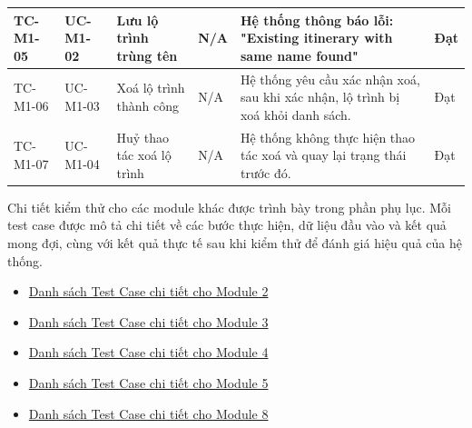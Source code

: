 \begin{landscape}
\begin{longtable}{|p{2.2cm}|p{2.2cm}|p{4cm}|p{4.5cm}|p{6cm}|p{2cm}|}
TC-M1-05 & UC-M1-02 & Lưu lộ trình trùng tên& 
N/A & 
Hệ thống thông báo lỗi: "Existing itinerary with same name found" & Đạt \\
\hline

TC-M1-06 & UC-M1-03 & Xoá lộ trình thành công & 
N/A & 
Hệ thống yêu cầu xác nhận xoá, sau khi xác nhận, lộ trình bị xoá khỏi danh sách. & Đạt \\
\hline

TC-M1-07 & UC-M1-04 & Huỷ thao tác xoá lộ trình & 
N/A & 
Hệ thống không thực hiện thao tác xoá và quay lại trạng thái trước đó. & Đạt \\
\hline


\end{longtable}
\end{landscape}

Chi tiết kiểm thử cho các module khác được trình bày trong phần phụ lục. Mỗi test case được mô tả chi tiết về các bước thực hiện, dữ liệu đầu vào và kết quả mong đợi, cùng với kết quả thực tế sau khi kiểm thử để đánh giá hiệu quả của hệ thống.
\begin{itemize}
    \item \hyperlink{target:tc_m2}{Danh sách Test Case chi tiết cho Module 2}
    \item \hyperlink{target:tc_m3}{Danh sách Test Case chi tiết cho Module 3}
    \item \hyperlink{target:tc_m4}{Danh sách Test Case chi tiết cho Module 4}
    \item \hyperlink{target:tc_m5}{Danh sách Test Case chi tiết cho Module 5}
    \item   \hyperlink{target:tc_m8}{Danh sách Test Case chi tiết cho Module 8}
\end{itemize}
